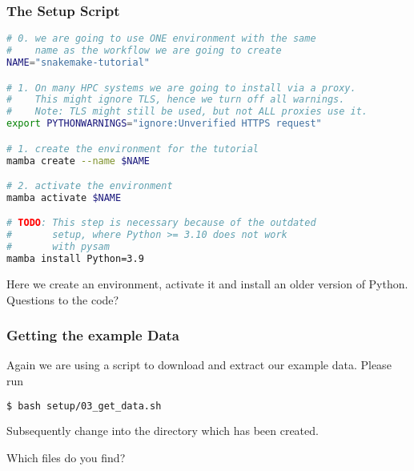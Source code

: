 \begin{frame}[fragile]
  \frametitle{The Setup Script}
  \begin{lstlisting}[language=Bash, style=Shell, basicstyle=\tiny]
# 0. we are going to use ONE environment with the same
#    name as the workflow we are going to create
NAME="snakemake-tutorial"

# 1. On many HPC systems we are going to install via a proxy.
#    This might ignore TLS, hence we turn off all warnings.
#    Note: TLS might still be used, but not ALL proxies use it.
export PYTHONWARNINGS="ignore:Unverified HTTPS request"

# 1. create the environment for the tutorial
mamba create --name $NAME

# 2. activate the environment
mamba activate $NAME

# TODO: This step is necessary because of the outdated 
#       setup, where Python >= 3.10 does not work
#       with pysam
mamba install Python=3.9
  \end{lstlisting}
  Here we create an environment, activate it and install an older version of Python. Questions to the code?
\end{frame}

\begin{frame}[fragile]
  \frametitle{Getting the example Data}
  Again we are using a script to download and extract our example data. Please run
  \begin{lstlisting}[language=Bash, style=Shell]
$ bash setup/03_get_data.sh
  \end{lstlisting}
  Subsequently change into the directory  which has been created. 
  \pause
  \begin{question}
  	Which files do you find?
  \end{question}
\end{frame}

